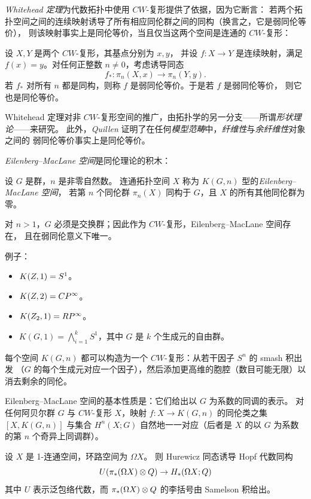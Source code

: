 \emph{Whitehead 定理}为代数拓扑中使用 $CW$-复形提供了依据，因为它断言：
若两个拓扑空间之间的连续映射诱导了所有相应同伦群之间的同构（换言之，它是弱同伦等价），
则该映射事实上是同伦等价，当且仅当这两个空间是连通的 $CW$-复形：

 设 $X, Y$ 是两个 $CW$-复形，其基点分别为 $x, y$，
并设 $f : X \to Y$ 是连续映射，满足 $f(x) = y$。对任何正整数 $n \neq 0$，考虑诱导同态
\[
  f_* : \pi_n(X, x) \to \pi_n(Y, y).
\]
若 $f_*$ 对所有 $n$ 都是同构，则称 $f$ 是弱同伦等价。于是若 $f$ 是弱同伦等价，
则它也是同伦等价。

Whitehead 定理对非 $CW$-复形空间的推广，由拓扑学的另一分支——所谓\emph{形状理论}——来研究。
此外，\emph{Quillen} 证明了在任何\emph{模型范畴}中，\emph{纤维性}与\emph{余纤维性}对象之间的
弱同伦等价事实上是同伦等价。

\emph{Eilenberg--MacLane 空间}是同伦理论的积木：

 设 $G$ 是群，$n$ 是非零自然数。
连通拓扑空间 $X$ 称为 $K(G, n)$ 型的\emph{Eilenberg--MacLane 空间}，
若第 $n$ 个同伦群 $\pi_n(X)$ 同构于 $G$，且 $X$ 的所有其他同伦群为零。

对 $n > 1$，$G$ 必须是交换群；因此作为 $CW$-复形，Eilenberg--MacLane 空间存在，
且在弱同伦意义下唯一。

例子：
\begin{itemize}
\item $K(Z, 1) = S^1$。
\item $K(Z, 2) = C P^{\infty}$。
\item $K(Z_2, 1) = R P^{\infty}$。
\item $K(G, 1) = \bigwedge_{i=1}^{k} S^1$，其中 $G$ 是 $k$ 个生成元的自由群。
\end{itemize}

每个空间 $K(G, n)$ 都可以构造为一个 $CW$-复形：从若干因子 $S^n$ 的 smash 积出发
（$G$ 的每个生成元对应一个因子），然后添加更高维的胞腔（数目可能无限）以消去剩余的同伦。

Eilenberg--MacLane 空间的基本性质是：它们给出以 $G$ 为系数的同调的表示。
对任何阿贝尔群 $G$ 与 $CW$-复形 $X$，映射 $f : X \to K(G, n)$ 的同伦类之集 $[X, K(G, n)]$
与集合 $H^n(X; G)$ 自然地一一对应（后者是 $X$ 的以 $G$ 为系数的第 $n$ 个奇异上同调群）。

 设 $X$ 是 1-连通空间，环路空间为 $\Omega X$。
则 Hurewicz 同态诱导 Hopf 代数同构
\[
  U(\pi_*(\Omega X) \otimes Q) \to H_*(\Omega X; Q)
\]
其中 $U$ 表示泛包络代数，而 $\pi_*(\Omega X) \otimes Q$ 的李括号由 Samelson 积给出。

